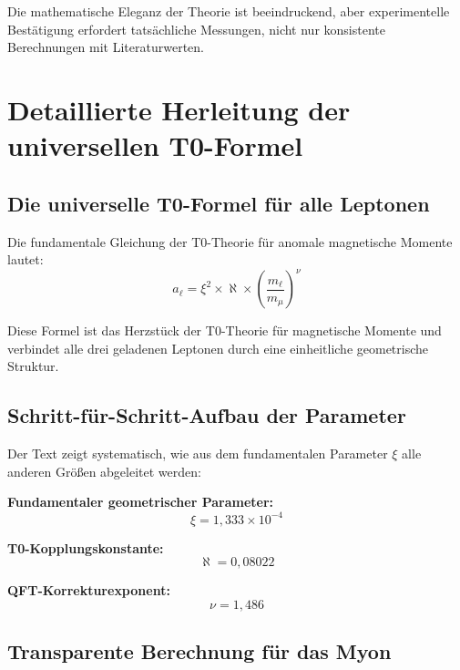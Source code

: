 \documentclass[12pt,a4paper]{article}
\begin{document}
\begin{summary}
		Die mathematische Eleganz der Theorie ist beeindruckend, aber experimentelle Best\"atigung erfordert tats\"achliche Messungen, nicht nur konsistente Berechnungen mit Literaturwerten.
	\end{summary}
	
	\section{Detaillierte Herleitung der universellen T0-Formel}

		\subsection{Die universelle T0-Formel f\"ur alle Leptonen}
		
		Die fundamentale Gleichung der T0-Theorie f\"ur anomale magnetische Momente lautet:
		\begin{equation}
			a_\ell = \xi^2 \times \aleph \times \left(\frac{m_\ell}{m_\mu}\right)^\nu
		\end{equation}
		
		Diese Formel ist das Herzst\"uck der T0-Theorie f\"ur magnetische Momente und verbindet alle drei geladenen Leptonen durch eine einheitliche geometrische Struktur.
		
		\subsection{Schritt-f\"ur-Schritt-Aufbau der Parameter}
		
		Der Text zeigt systematisch, wie aus dem fundamentalen Parameter $\xi$ alle anderen Gr\"o\ss{}en abgeleitet werden:
		
		\textbf{Fundamentaler geometrischer Parameter:}
		\begin{equation}
			\xi = 1{,}333 \times 10^{-4}
		\end{equation}
		
		\textbf{T0-Kopplungskonstante:}
		\begin{equation}
			\aleph = 0{,}08022
		\end{equation}
		
		\textbf{QFT-Korrekturexponent:}
		\begin{equation}
			\nu = 1{,}486
		\end{equation}
		
		\subsection{Transparente Berechnung f\"ur das Myon}
		
\end{document}
